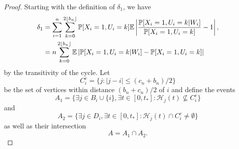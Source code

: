 	\begin{proof}
	Starting with the definition of $\delta_1$, we have
		\begin{align}
			\delta_1 &= %
			\sum_{i = 1}^n \sum_{k = 0}^{2 \lfloor b_n\rfloor} \prob[X_i = 1, U_i = k] \expect \left| \frac{\prob[X_i = 1, U_i = k|W_i]}{\prob[X_i = 1, U_i = k]} - 1 \right|,\\
			&= n \sum_{k = 0}^{2 \lfloor b_n\rfloor} \expect \left|\prob[X_i = 1, U_i = k|W_i] - \prob[X_i = 1, U_i = k] \right|%
			\label{eq: delta1 line 2}
		\end{align}
		by the transitivity of the cycle.
		Let
		\begin{equation}
			C_i^c = \{j : |j - i| \leq (c_n + b_n)/2\}
		\end{equation}
		be the set of vertices within distance $(b_n + c_n)/2$ of $i$ and define the events
		\begin{equation}
			A_1 = \{\exists j \in B_i \cup \{i\}, \exists t \in [0, t_*] : \mathcal{H}_j(t) \nsubseteq  C_i^c\}
		\end{equation}
		and
		\begin{equation}
			A_2 = \{\exists j \in D_i, \exists t \in [0, t_*] : \mathcal{H}_j(t) \cap C_i^c \neq \emptyset\}
		\end{equation}
		as well as their intersection
		\begin{equation}
			A = A_1 \cap A_2.
		\end{equation}


\end{proof}
